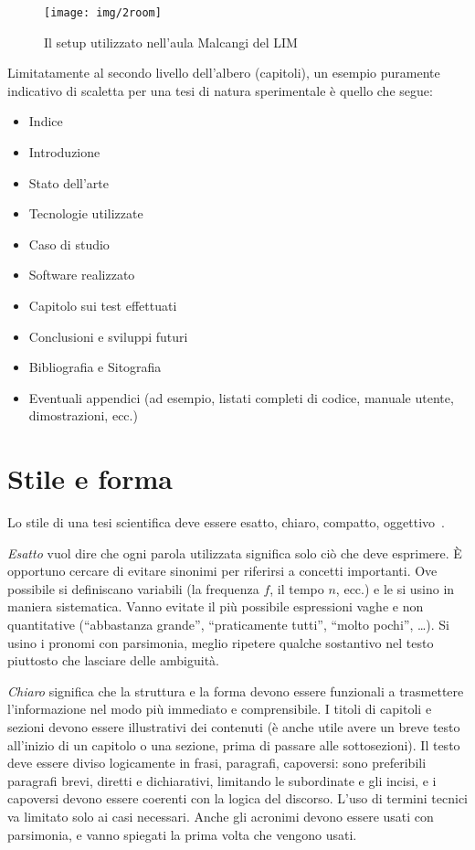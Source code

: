 \documentclass[12pt]{report}
\begin{document}
\begin{figure}[t]
	\texttt{[image: img/2room]}
	\caption{Il setup utilizzato nell'aula Malcangi del LIM}
	\label{fig:room}
\end{figure}

Limitatamente al secondo livello dell'albero (capitoli), un esempio puramente indicativo di scaletta per una tesi di natura sperimentale è quello che segue:
\begin{itemize}
	\item Indice
	\item Introduzione
	\item Stato dell'arte
	\item Tecnologie utilizzate
	\item Caso di studio
	\item Software realizzato
	\item Capitolo sui test effettuati
	\item Conclusioni e sviluppi futuri
	\item Bibliografia e Sitografia
	\item Eventuali appendici (ad esempio, listati completi di codice, manuale utente, dimostrazioni, ecc.)
\end{itemize}


\section{Stile e forma}
\label{sec:forma}


Lo stile di una tesi scientifica deve essere esatto, chiaro, compatto, oggettivo~\cite{strunk1999style}.

{\em Esatto} vuol dire che ogni parola utilizzata significa solo ci\`o che deve esprimere. \`E opportuno cercare di evitare sinonimi per riferirsi a concetti importanti. Ove possibile si definiscano variabili (la frequenza $f$, il tempo $n$, ecc.) e le si usino in maniera sistematica. Vanno evitate il pi\`u possibile espressioni vaghe e non quantitative (``abbastanza grande'', ``praticamente tutti'', ``molto pochi'', \ldots). Si usino i pronomi con parsimonia, meglio ripetere qualche sostantivo nel testo piuttosto che lasciare delle ambiguit\`a.

{\em Chiaro} significa che la struttura e la forma devono essere funzionali a trasmettere l'informazione nel modo pi\`u immediato e comprensibile. I titoli di capitoli e sezioni devono essere illustrativi dei contenuti (\`e anche utile avere un breve testo all'inizio di un capitolo o una sezione, prima di passare alle sottosezioni). Il testo deve essere diviso logicamente in frasi, paragrafi, capoversi: sono preferibili paragrafi brevi, diretti e dichiarativi, limitando le subordinate e gli incisi, e i capoversi devono essere coerenti con la logica del discorso. L'uso di termini tecnici va limitato solo ai casi necessari. Anche gli acronimi devono essere usati con parsimonia, e vanno spiegati la prima volta che vengono usati. 
\end{document}
